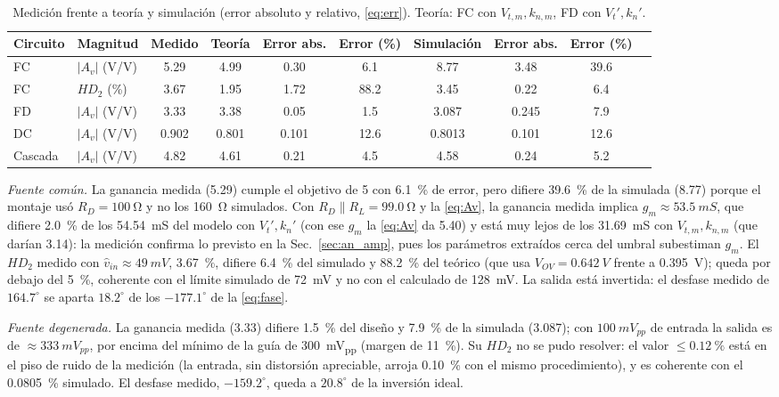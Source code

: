 \documentclass[conference]{IEEEtran}
\newcommand{\gm}{g_m}
\newcommand{\Vov}{V_{OV}}
\newcommand{\Vtp}{V_t'}
\newcommand{\knp}{k_n'}
\newcommand{\Vtm}{V_{t,m}}
\newcommand{\knm}{k_{n,m}}
\begin{document}
\begin{table}[htbp]
\centering
\caption{Medición frente a teoría y simulación (error absoluto y relativo, \eqref{eq:err}). Teoría: FC con $\Vtm,\knm$, FD con $\Vtp,\knp$.}
\label{tab:med_cmp}
\scriptsize
\renewcommand{\arraystretch}{1.03}
\setlength{\tabcolsep}{5pt}
\begin{tabular}{@{}llcccccccc@{}}
\toprule
Circuito & Magnitud & Medido & Teoría & Error abs. & Error (\%) & Simulación & Error abs. & Error (\%) \\
\midrule
FC & $|A_v|$ (V/V) & 5.29 & 4.99 & 0.30 & 6.1 & 8.77 & 3.48 & 39.6 \\
FC & $HD_2$ (\%) & 3.67 & 1.95 & 1.72 & 88.2 & 3.45 & 0.22 & 6.4 \\
FD & $|A_v|$ (V/V) & 3.33 & 3.38 & 0.05 & 1.5 & 3.087 & 0.245 & 7.9 \\
DC & $|A_v|$ (V/V) & 0.902 & 0.801 & 0.101 & 12.6 & 0.8013 & 0.101 & 12.6 \\
Cascada & $|A_v|$ (V/V) & 4.82 & 4.61 & 0.21 & 4.5 & 4.58 & 0.24 & 5.2 \\
\bottomrule
\end{tabular}
\end{table}

\textit{Fuente común.} La ganancia medida (5.29) cumple el objetivo de 5 con \SI{6.1}{\percent} de error, pero difiere \SI{39.6}{\percent} de la simulada (8.77) porque el montaje usó $R_D=\SI{100}{\ohm}$ y no los \SI{160}{\ohm} simulados. Con $R_D\parallel R_L=\SI{99.0}{\ohm}$ y la \eqref{eq:Av}, la ganancia medida implica $\gm\approx\SI{53.5}{mS}$, que difiere \SI{2.0}{\percent} de los \SI{54.54}{mS} del modelo con $\Vtp,\knp$ (con ese $\gm$ la \eqref{eq:Av} da 5.40) y está muy lejos de los \SI{31.69}{mS} con $\Vtm,\knm$ (que darían 3.14): la medición confirma lo previsto en la Sec.~\ref{sec:an_amp}, pues los parámetros extraídos cerca del umbral subestiman $\gm$. El $HD_2$ medido con $\hat v_{in}\approx\SI{49}{mV}$, \SI{3.67}{\percent}, difiere \SI{6.4}{\percent} del simulado y \SI{88.2}{\percent} del teórico (que usa $\Vov=\SI{0.642}{V}$ frente a \SI{0.395}{V}); queda por debajo del \SI{5}{\percent}, coherente con el límite simulado de \SI{72}{mV} y no con el calculado de \SI{128}{mV}. La salida está invertida: el desfase medido de $164.7^\circ$ se aparta $18.2^\circ$ de los $-177.1^\circ$ de la \eqref{eq:fase}.

\textit{Fuente degenerada.} La ganancia medida (3.33) difiere \SI{1.5}{\percent} del diseño y \SI{7.9}{\percent} de la simulada (3.087); con $\SI{100}{mV_{pp}}$ de entrada la salida es de $\approx\SI{333}{mV_{pp}}$, por encima del mínimo de la guía de \SI{300}{mV_{pp}} (margen de \SI{11}{\percent}). Su $HD_2$ no se pudo resolver: el valor $\le\SI{0.12}{\percent}$ está en el piso de ruido de la medición (la entrada, sin distorsión apreciable, arroja \SI{0.10}{\percent} con el mismo procedimiento), y es coherente con el \SI{0.0805}{\percent} simulado. El desfase medido, $-159.2^\circ$, queda a $20.8^\circ$ de la inversión ideal.
\end{document}

